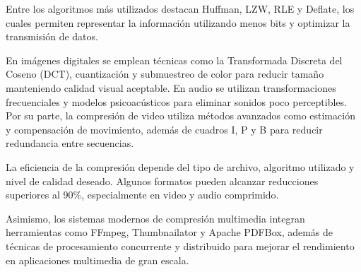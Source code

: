 Entre los algoritmos más utilizados destacan Huffman, LZW, RLE y Deflate, los cuales permiten representar la información utilizando menos bits y optimizar la transmisión de datos.

En imágenes digitales se emplean técnicas como la Transformada Discreta del Coseno (DCT), cuantización y submuestreo de color para reducir tamaño manteniendo calidad visual aceptable. En audio se utilizan transformaciones frecuenciales y modelos psicoacústicos para eliminar sonidos poco perceptibles. Por su parte, la compresión de video utiliza métodos avanzados como estimación y compensación de movimiento, además de cuadros I, P y B para reducir redundancia entre secuencias.

La eficiencia de la compresión depende del tipo de archivo, algoritmo utilizado y nivel de calidad deseado. Algunos formatos pueden alcanzar reducciones superiores al 90\%, especialmente en video y audio comprimido.

Asimismo, los sistemas modernos de compresión multimedia integran herramientas como FFmpeg, Thumbnailator y Apache PDFBox, además de técnicas de procesamiento concurrente y distribuido para mejorar el rendimiento en aplicaciones multimedia de gran escala.
